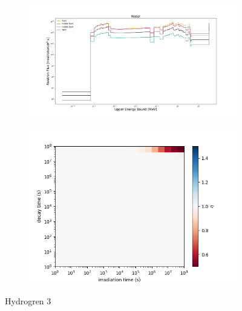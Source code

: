 \begin{figure}[!ht]
    \begin{subfigure}{0.5\textwidth}
        \includegraphics[scale=0.23, trim={4cm 1cm 4cm 2cm},clip]{figs/water_flux.png}
    \end{subfigure}
    \begin{subfigure}{0.5\textwidth}
        \centering
        \includegraphics[scale=0.45, trim={0cm 0cm 2cm 0cm},clip]{figs/water_front.png}
    \end{subfigure}
    \caption{Hydrogren 3 }
    \label{fig:1spec_8v}
\end{figure}
